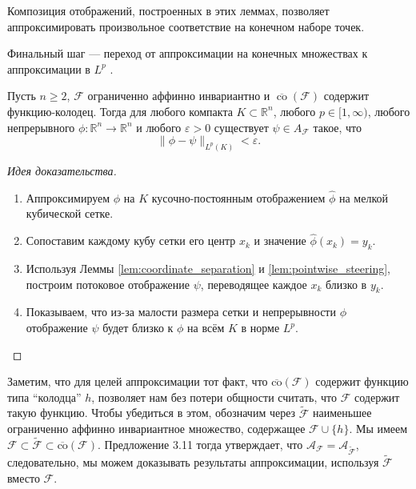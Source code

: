 \documentclass[../NDCNNAI_main.tex]{subfiles}
\begin{document}
Композиция отображений, построенных в этих леммах, позволяет аппроксимировать произвольное соответствие на конечном наборе точек.

Финальный шаг --- переход от аппроксимации на конечных множествах к аппроксимации в $L^p$ \cite[Предложение 4.11]{Li2023DeepLD}.

\begin{proposition}
\label{prop:high_dim_density}
Пусть $n \geq 2$, $\mathcal{F}$ ограниченно аффинно инвариантно и $\overline{\operatorname{co}}(\mathcal{F})$ содержит функцию-колодец. Тогда для любого компакта $K \subset \mathbb{R}^n$, любого $p \in [1, \infty)$, любого непрерывного $\phi: \mathbb{R}^n \to \mathbb{R}^n$ и любого $\varepsilon > 0$ существует $\psi \in A_{\mathcal{F}}$ такое, что
\[\| \phi - \psi \|_{L^p(K)} < \varepsilon.\]
\end{proposition}

\begin{proof}[Идея доказательства]
\begin{enumerate}
    \item Аппроксимируем $\phi$ на $K$ кусочно-постоянным отображением $\hat{\phi}$ на мелкой кубической сетке.
    \item Сопоставим каждому кубу сетки его центр $x_k$ и значение $\hat{\phi}(x_k) = y_k$.
    \item Используя Леммы \ref{lem:coordinate_separation} и \ref{lem:pointwise_steering}, построим потоковое отображение $\psi$, переводящее каждое $x_k$ близко в $y_k$.
    \item Показываем, что из-за малости размера сетки и непрерывности $\phi$ отображение $\psi$ будет близко к $\phi$ на всём $K$ в норме $L^p$.
\end{enumerate}
\end{proof}

Заметим, что для целей аппроксимации тот факт, что \(\overline{\text{co}}(\mathcal{F})\) содержит функцию типа ``колодца'' \(h\), позволяет нам без потери общности считать, что \(\mathcal{F}\) содержит такую функцию. Чтобы убедиться в этом, обозначим через \(\tilde{\mathcal{F}}\) наименьшее ограниченно аффинно инвариантное множество, содержащее \(\mathcal{F} \cup \{h\}\). Мы имеем \(\mathcal{F} \subset \tilde{\mathcal{F}} \subset \overline{\text{co}}(\mathcal{F})\). Предложение 3.11 тогда утверждает, что \(\mathcal{A}_{\mathcal{F}} = \mathcal{A}_{\tilde{\mathcal{F}}}\), следовательно, мы можем доказывать результаты аппроксимации, используя \(\tilde{\mathcal{F}}\) вместо \(\mathcal{F}\).
\end{document}
